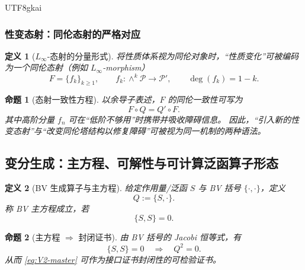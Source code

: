 \documentclass[12pt]{article}
\newtheorem{definition}{定义}[section]
\newtheorem{proposition}{命题}[section]
\begin{document}
\begin{CJK*}{UTF8}{gkai}
\subsubsection{性变态射：同伦态射的严格对应}
\label{subsubsec:tex18-morphisms}

\begin{definition}[$L_\infty$-态射的分量形式]
将性质体系视为同伦对象时，“性质变化”可被编码为一个同伦态射（例如 $L_\infty$-morphism）
\begin{equation}
\tag{B5}
\label{eq:B5-linfty-morphism}
  F=\{f_k\}_{k\ge 1},
  \qquad
  f_k:\wedge^k\mathcal{P}\to \mathcal{P}',
  \qquad
  \deg(f_k)=1-k.
\end{equation}
\end{definition}

\begin{proposition}[态射一致性方程]
以余导子表述，$F$ 的同伦一致性可写为
\begin{equation}
\tag{B6}
\label{eq:B6-morphism-compat}
  F\circ Q = Q'\circ F.
\end{equation}
其中高阶分量 $f_n$ 可在“低阶不够用”时携带并吸收障碍信息。
因此，“引入新的性变态射”与“改变同伦塔结构以修复障碍”可被视为同一机制的两种语法。
\end{proposition}

\subsection{变分生成：主方程、可解性与可计算泛函算子形态}
\label{subsec:tex18-variational}

\begin{definition}[BV 生成算子与主方程]
给定作用量/泛函 $S$ 与 BV 括号 $\{\cdot,\cdot\}$，定义\cite{BV1981}
\begin{equation}
\tag{V1}
\label{eq:V1-Q}
  Q:=\{S,\cdot\}.
\end{equation}
称 BV 主方程成立，若
\begin{equation}
\tag{V2}
\label{eq:V2-master}
  \{S,S\}=0.
\end{equation}
\end{definition}

\begin{proposition}[主方程 $\Rightarrow$ 封闭证书]
由 BV 括号的 Jacobi 恒等式，有
\begin{equation}
\tag{V3}
\label{eq:V3-Q-square}
  \{S,S\}=0
  \quad\Longrightarrow\quad
  Q^2=0.
\end{equation}
从而 \eqref{eq:V2-master} 可作为接口证书封闭性的可检验证书。
\end{proposition}


\end{CJK*}
\end{document}
